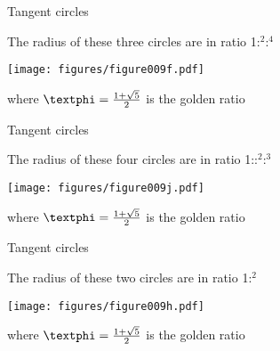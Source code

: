 \documentclass[14pt]{beamer}
\begin{document}

    \begin{frame}{Tangent circles}
        \begin{center}
            The radius of these three circles are in ratio 1:\textphi$^2$:\textphi$^4$
        \end{center}\medskip
        \hspace{6.18em} \texttt{[image: figures/figure009f.pdf]} \\
        \begin{center}
             where $\text{\textphi} =\tfrac{1+\sqrt{5}}{2}$ is the golden ratio
        \end{center}
    \end{frame}


    \begin{frame}{Tangent circles}
        \begin{center}
            The radius of these four circles are in ratio 1:\textphi:\textphi$^2$:\textphi$^3$
        \end{center}\medskip
        \hspace{6.18em} \texttt{[image: figures/figure009j.pdf]} \\
        \begin{center}
             where $\text{\textphi} =\tfrac{1+\sqrt{5}}{2}$ is the golden ratio
        \end{center}
    \end{frame}


    \begin{frame}{Tangent circles}
        \begin{center}
            The radius of these two circles are in ratio 1:\textphi$^2$
        \end{center}\medskip
        \hspace{6.18em} \texttt{[image: figures/figure009h.pdf]} \\
        \begin{center}
             where $\text{\textphi} =\tfrac{1+\sqrt{5}}{2}$ is the golden ratio
        \end{center}
    \end{frame}
\end{document}
